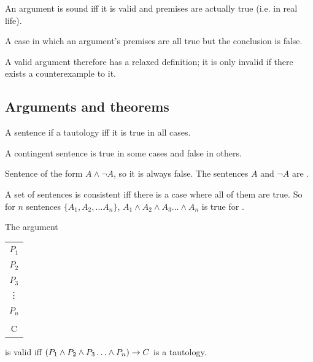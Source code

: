 \begin{definition} [Soundness]
    An argument is sound iff it is valid and premises are actually true (i.e. in real life).
\end{definition}

\begin{definition}[Counterexample]
    A case in which an argument's premises are all true but the conclusion is false.
\end{definition}

A valid argument therefore has a relaxed definition; it is only invalid if there exists a counterexample to it.

\subsection{Arguments and theorems}

\begin{definition}[Tautology]
    A sentence if a tautology iff it is true in all cases.
\end{definition}

\begin{definition}[Contingent]
    A contingent sentence is true in some cases and false in others.
\end{definition}

\begin{definition}[Contradiction]
    Sentence of the form $A\land \lnot A$, so it is always false. The sentences $A$ and $\lnot A$ are .
\end{definition}

\begin{definition}[Consistent]
    A set of sentences is consistent iff there is a case where all of them are true. So for $n$ sentences $\{A_1,A_2,\ldots A_n\}$, $A_1\land A_2\land A_3\ldots \land A_n$ is true for .
\end{definition}

\begin{definition}
    The argument\\
    
    \begin{center}
        \begin{tabular}{c}
            $P_1$\\$P_2$\\$P_3$\\\vdots\\$P_n$\\\hline\\C
        \end{tabular}
    \end{center}

    is valid iff $(P_1\land P_2\land P_3\ldots \land P_n)\rightarrow C$ is a tautology.
\end{definition}

